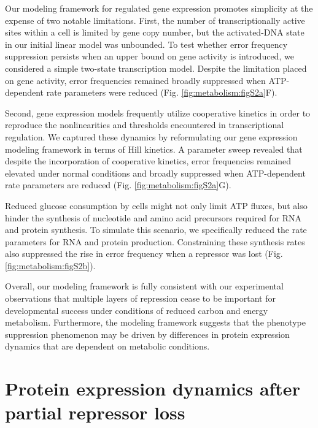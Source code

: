 Our modeling framework for regulated gene expression promotes simplicity at the expense of two notable limitations. First, the number of transcriptionally active sites within a cell is limited by gene copy number, but the activated-DNA state in our initial linear model was unbounded. To test whether error frequency suppression persists when an upper bound on gene activity is introduced, we considered a simple two-state transcription model. Despite the limitation placed on gene activity, error frequencies remained broadly suppressed when ATP-dependent rate parameters were reduced (Fig. \ref{fig:metabolism:figS2a}F).

Second, gene expression models frequently utilize cooperative kinetics in order to reproduce the nonlinearities and thresholds encountered in transcriptional regulation. We captured these dynamics by reformulating our gene expression modeling framework in terms of Hill kinetics. A parameter sweep revealed that despite the incorporation of cooperative kinetics, error frequencies remained elevated under normal conditions and broadly suppressed when ATP-dependent rate parameters are reduced (Fig. \ref{fig:metabolism:figS2a}G).

Reduced glucose consumption by cells might not only limit ATP fluxes, but also hinder the synthesis of nucleotide and amino acid precursors required for RNA and protein synthesis. To simulate this scenario, we specifically reduced the rate parameters for RNA and protein production. Constraining these synthesis rates also suppressed the rise in error frequency when a repressor was lost (Fig. \ref{fig:metabolism:figS2b}).

Overall, our modeling framework is fully consistent with our experimental observations that multiple layers of repression cease to be important for developmental success under conditions of reduced carbon and energy metabolism. Furthermore, the modeling framework suggests that the phenotype suppression phenomenon may be driven by differences in protein expression dynamics that are dependent on metabolic conditions.

\section{Protein expression dynamics after partial repressor loss}

